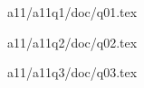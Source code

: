 


\newcommand\myincludetex[1]{\textbox{{\scriptsize \texttt{#1}}}


    

}

\newcommand\myincludesrc[1]{\textbox{{\scriptsize \texttt{#1}}}


    \VerbatimInput[fontsize=\footnotesize,frame=single]{#1}

}
    

\newpage
        
        

a11/a11q1/doc/q01.tex
        
        

\newpage
        
        

a11/a11q2/doc/q02.tex
        
        

\newpage
        
        

a11/a11q3/doc/q03.tex
        
        

    